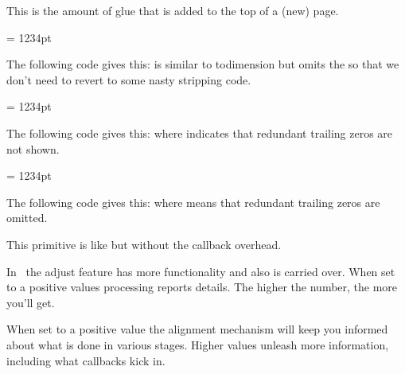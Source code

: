 \startoldprimitive[title={\prm {topskip}}]

This is the amount of glue that is added to the top of a (new) page.

\stopoldprimitive

\startnewprimitive[title={\prm {toscaled}}]

\startbuffer
\scratchdimen = 1234pt \toscaled\scratchdimen
\stopbuffer

The following code gives this: {\nospacing\inlinebuffer} is similar to \prm
{todimension} but omits the  so that we don't need to revert to some
nasty stripping code.

\typebuffer

\stopnewprimitive

\startnewprimitive[title={\prm {tosparsedimension}}]

\startbuffer
\scratchdimen = 1234pt \tosparsedimension\scratchdimen
\stopbuffer

The following code gives this: {\nospacing\inlinebuffer} where 
indicates that redundant trailing zeros are not shown.

\typebuffer

\stopnewprimitive

\startnewprimitive[title={\prm {tosparsescaled}}]

\startbuffer
\scratchdimen = 1234pt \tosparsescaled\scratchdimen
\stopbuffer

The following code gives this: {\nospacing\inlinebuffer} where 
means that redundant trailing zeros are omitted.

\typebuffer

\stopnewprimitive

\startnewprimitive[title={\prm {tpack}}]

This primitive is like  but without the callback overhead.

\stopnewprimitive

\startnewprimitive[title={\prm {tracingadjusts}}]

In \LUAMETATEX\ the adjust feature has more functionality and also is carried
over. When set to a positive values  processing reports details.
The higher the number, the more you'll get.

\stopnewprimitive

\startnewprimitive[title={\prm {tracingalignments}}]

When set to a positive value the alignment mechanism will keep you informed about
what is done in various stages. Higher values unleash more information, including
what callbacks kick in.


